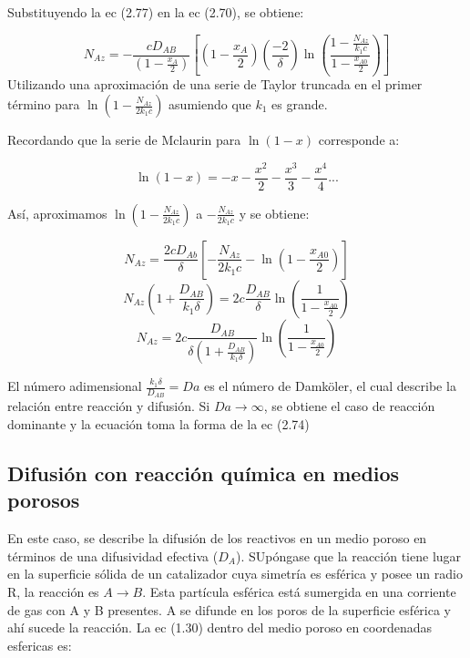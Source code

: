 Substituyendo la ec (2.77) en la ec (2.70), se obtiene:

\begin{equation*}
    N_{Az}=-\frac{cD_{AB}}{(1-\frac{x_A}{2})}[(1-\frac{x_A}{2})(\frac{-2}{\delta})\ln (\frac{1-\frac{N_{Az}}{k_1c}}{1-\frac{x_{A0}}{2}})]
\end{equation*}
Utilizando una aproximación de una serie de Taylor truncada en el primer término para $\ln (1-\frac{N_{Az}}{2k_1c})$ asumiendo que $k_1$ es grande.

Recordando que la serie de Mclaurin para $\ln (1-x)$ corresponde a:

\begin{equation*}
    \ln (1-x)=-x-\frac{x^2}{2}-\frac{x^3}{3}-\frac{x^4}{4}...
\end{equation*}

Así, aproximamos $\ln (1-\frac{N_{Az}}{2k_1c})$ a $-\frac{N_{Az}}{2k_1c}$
y se obtiene:

\begin{equation*}
   N_{Az}=\frac{2cD_{Ab}}{\delta}[-\frac{N_{Az}}{2k_1c}-\ln (1-\frac{x_{A0}}{2})] 
\end{equation*}
\begin{equation*}
   N_{Az}(1+\frac{D_{AB}}{k_1\delta})=2c\frac{D_{AB}}{\delta}\ln (\frac{1}{1-\frac{x_{A0}}{2}}  )  
\end{equation*}
\begin{equation}
   N_{Az}=2c\frac{D_{AB}}{\delta(1+\frac{D_{AB}}{k_1\delta})}\ln (\frac{1}{1-\frac{x_{A0}}{2}}  )  
\end{equation}

El número adimensional $\frac{k_1\delta}{D_{AB}}=Da$ es el número de Damköler, el cual describe la relación entre reacción y difusión. Si $Da\rightarrow\infty$, se obtiene el caso de reacción dominante y la ecuación toma la forma de la ec (2.74)

\subsection{Difusión con reacción química en medios porosos}

En este caso, se describe la difusión de los reactivos en un medio poroso en términos de una difusividad efectiva ($D_A$). SUpóngase que la reacción tiene lugar en la superficie sólida de un catalizador cuya simetría es esférica y posee un radio R, la reacción es $A\rightarrow B$. Esta partícula esférica está sumergida en una corriente de gas con A y B presentes. A se difunde en los poros de la superficie esférica y ahí sucede la reacción. La ec (1.30) dentro del medio poroso en coordenadas esfericas es:

